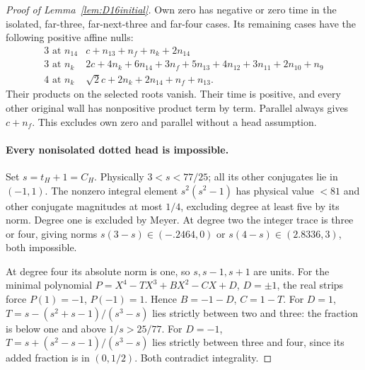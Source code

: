 \documentclass[11pt]{article}
\begin{document}
\begin{proof}[Proof of Lemma~\ref{lem:D16initial}]
Own zero has negative or zero time in the isolated, far-three,
far-next-three and far-four cases. Its remaining cases have the
following positive affine nulls:
\[
\begin{array}{c|l}
3\text{ at }n_{14}&c+n_{13}+n_f+n_k+2n_{14}\\
3\text{ at }n_k&2c+4n_k+6n_{14}+3n_f+5n_{13}
                  +4n_{12}+3n_{11}+2n_{10}+n_9\\
4\text{ at }n_k&\sqrt2c+2n_k+2n_{14}+n_f+n_{13}.
\end{array}
\]
Their products on the selected roots vanish. Their time is positive,
and every other original wall has nonpositive product term by term.
Parallel always gives $c+n_f$. This excludes own zero and parallel
without a head assumption.

\paragraph{Every nonisolated dotted head is impossible.}
Set $s=t_H+1=C_H$. Physically $3<s<77/25$; all its other
conjugates lie in $(-1,1)$. The nonzero integral element
$s^2(s^2-1)$ has physical value $<81$ and other conjugate
magnitudes at most $1/4$, excluding degree at least five by its norm.
Degree one is excluded by Meyer. At degree two the integer trace is
three or four, giving norms $s(3-s)\in(-.2464,0)$ or
$s(4-s)\in(2.8336,3)$, both impossible.

At degree four its absolute norm is one, so $s,s-1,s+1$ are units.
For the minimal polynomial $P=X^4-TX^3+BX^2-CX+D$,
$D=\pm1$, the real strips force $P(1)=-1$, $P(-1)=1$.
Hence $B=-1-D$, $C=1-T$.
For $D=1$,
$T=s-(s^2+s-1)/(s^3-s)$ lies strictly between two and three:
the fraction is below one and above $1/s>25/77$.
For $D=-1$,
$T=s+(s^2-s-1)/(s^3-s)$ lies strictly between three and four,
since its added fraction is in $(0,1/2)$. Both contradict integrality.


\end{proof}
\end{document}
